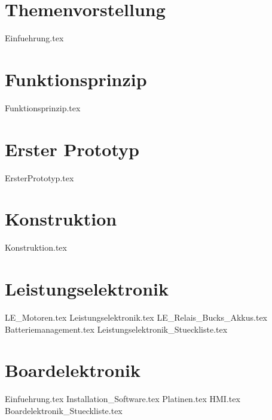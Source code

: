 \documentclass[paper=a4,12pt]{scrreprt}
\begin{document}
\mainmatter
\chapter{Themenvorstellung}
{Einfuehrung.tex}

\chapter{Funktionsprinzip}
{Funktionsprinzip.tex}


\chapter{Erster Prototyp}
{ErsterPrototyp.tex}

\chapter{Konstruktion}
{Konstruktion.tex}

\chapter{Leistungselektronik}
{LE_Motoren.tex}
{Leistungselektronik.tex}
{LE_Relais_Bucks_Akkus.tex}
{Batteriemanagement.tex}
{Leistungselektronik_Stueckliste.tex}

\chapter{Boardelektronik}
{Einfuehrung.tex}
{Installation_Software.tex}
{Platinen.tex}
{HMI.tex}
{Boardelektronik_Stueckliste.tex}
\end{document}
